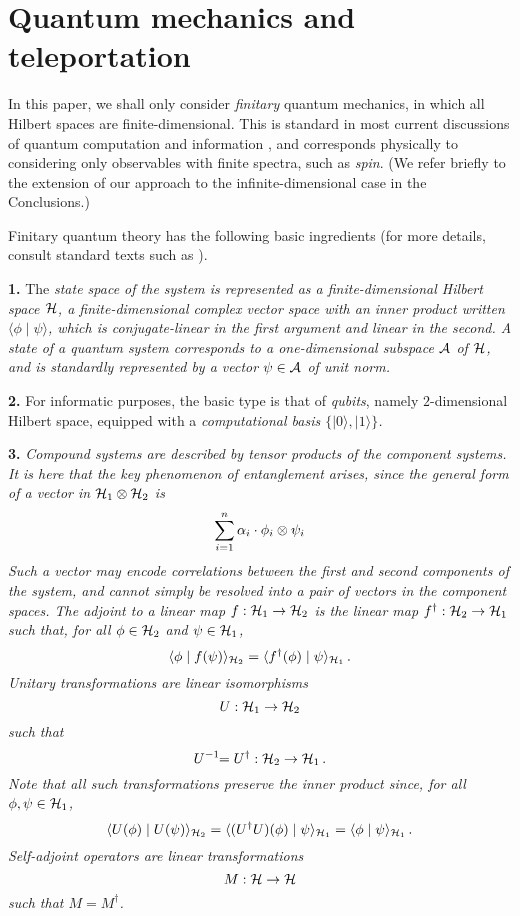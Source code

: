 \documentclass[10pt]{article}
\begin{document}
\section{Quantum mechanics and teleportation}    

In this paper, we shall only consider \emph{finitary} quantum
mechanics, in which all Hilbert spaces are finite-dimensional. This is 
standard in most current discussions of quantum computation and
information \cite{Nielsen},
and corresponds physically to considering only observables with finite
spectra, such as \emph{spin}. (We  refer briefly to the extension 
of our approach to the infinite-dimensional case in the
Conclusions.)    

Finitary quantum theory has the following basic ingredients (for
more details, consult standard texts such as \cite{Isham}).
\ben
\item[{\bf 1.}] The \em state space \em of the system is represented as a
  finite-dimensional Hilbert space $\mathcal{H}$, \ie a finite-dimensional complex
  vector space with an inner product written $\langle \phi \mid \psi
  \rangle$, which is conjugate-linear in the first argument and linear 
  in the second.  A \emph{state} of a quantum system
corresponds to a one-dimensional subspace ${\cal A}$ of $\mathcal{H}$, and is standardly
represented by a vector $\psi\in {\cal A}$ of unit norm. 
\item[{\bf 2.}] For informatic purposes, the basic type is that of
  \emph{qubits}, namely $2$-dimensional Hilbert space, equipped with a
  \em computational basis \em $\{|0\rangle,|1\rangle\}$.
\item[{\bf 3.}] \em Compound systems \em are described by tensor products of the
  component systems. It is here that the key phenomenon of
 \em entanglement \em arises, since the general form of a vector in $\mathcal{H}_1
  \otimes \mathcal{H}_2$ is\vspace{-1.20mm}
\[ 
\sum_{i=1}^n \alpha_i\cdot \phi_i \otimes \psi_i\vspace{-1.20mm} 
\] 
Such a vector may encode \emph{correlations} between the 
first and second components of the system, and cannot simply be
resolved into a pair of vectors in the component spaces.
\een
The \em adjoint \em to a linear map
$f:{\cal H}_1\to{\cal H}_2$ is the  linear map $f^\dagger:{\cal
H}_2\to{\cal H}_1$ such that, for all $\phi\in {\cal H}_2$ and  
$\psi\in {\cal H}_1$,
\[
\langle\phi \mid f(\psi)\rangle_{{\cal H}_2} = \langle f^\dagger(\phi) \mid
\psi\rangle_{{\cal H}_1}\,.
\]
\emph{Unitary
  transformations} are linear isomorphisms 
\[
U:{\cal H}_1\to{\cal H}_2
\] 
such that
\[
U^{-1}\!\!=U^\dagger:{\cal H}_2\to{\cal H}_1\,.
\]
Note that all such transformations 
\em preserve the inner product \em since,
for all $\phi,\psi\in{\cal H}_1$,
\[
\langle U(\phi) \mid U(\psi)\rangle_{{\cal H}_2}=\langle (U^\dagger U)(\phi) \mid
\psi\rangle_{{\cal H}_1}=\langle \phi \mid \psi\rangle_{{\cal H}_1}\,.
\]
\em Self-adjoint operators \em are linear transformations
\[
M :{\cal H}\to{\cal H}
\]
such that $M=M^\dagger$.
\end{document}
